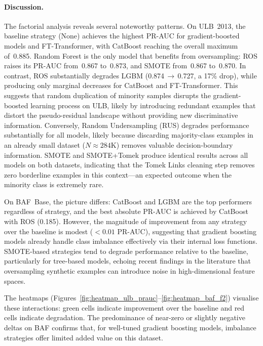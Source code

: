\paragraph{Discussion.}
  The factorial analysis reveals several noteworthy patterns.
  On ULB~2013, the baseline strategy (None) achieves the highest PR-AUC for gradient-boosted models and FT-Transformer, with CatBoost reaching the overall maximum of~0.885. Random Forest is the only model that benefits from oversampling: ROS raises its PR-AUC from~0.867 to~0.873, and SMOTE from~0.867 to~0.870. In contrast, ROS substantially degrades LGBM (0.874\,$\to$\,0.727, a 17\% drop), while producing only marginal decreases for CatBoost and FT-Transformer. This suggests that random duplication of minority samples disrupts the gradient-boosted learning process on ULB, likely by introducing redundant examples that distort the pseudo-residual landscape without providing new discriminative information. Conversely, Random Undersampling (RUS) degrades performance substantially for all models, likely because discarding majority-class examples in an already small dataset ($N\approx284\text{K}$) removes valuable decision-boundary information.
  SMOTE and SMOTE+Tomek produce identical results across all models on both datasets, indicating that the Tomek Links cleaning step removes zero borderline examples in this context---an expected outcome when the minority class is extremely rare.

  On BAF~Base, the picture differs: CatBoost and LGBM are the top performers regardless of strategy, and the best absolute PR-AUC is achieved by CatBoost with ROS (0.185). However, the magnitude of improvement from any strategy over the baseline is modest ($<0.01$ PR-AUC), suggesting that gradient boosting models already handle class imbalance effectively via their internal loss functions. SMOTE-based strategies tend to degrade performance relative to the baseline, particularly for tree-based models, echoing recent findings in the literature that oversampling synthetic examples can introduce noise in high-dimensional feature spaces.

  The heatmaps (Figures~\ref{fig:heatmap_ulb_prauc}--\ref{fig:heatmap_baf_f2}) visualise these interactions: green cells indicate improvement over the baseline and red cells indicate degradation. The predominance of near-zero or slightly negative deltas on BAF confirms that, for well-tuned gradient boosting models, imbalance strategies offer limited added value on this dataset.




